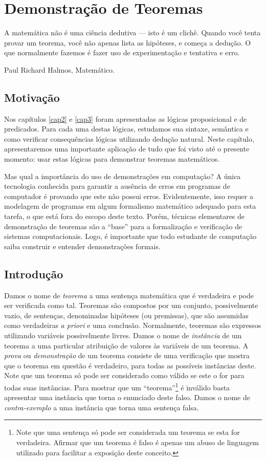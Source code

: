 \chapter{Demonstração de Teoremas}\label{cap4}

\epigraph{A matemática não é uma ciência dedutiva --- isto é um
  clichê. Quando você tenta provar um teorema, você não apenas lista
  as hipóteses, e começa a dedução. O que normalmente fazemos é fazer
  uso de experimentação e tentativa e erro.}{Paul Richard Halmos,
  Matemático.}

\section{Motivação}

Nos capítulos \ref{cap2} e \ref{cap3} foram apresentadas as lógicas
proposicional e de predicados. Para cada uma destas lógicas, estudamos
sua sintaxe, semântica e como verificar consequências lógicas
utilizando dedução natural. Neste capítulo, apresentaremos uma
importante aplicação de tudo que foi visto até o presente momento:
usar estas lógicas para demonstrar teoremas matemáticos.

Mas qual a importância do uso de demonstrações em computação? A única
tecnologia conhecida para garantir a ausência de erros em programas de
computador é provando que este não possui
erros. Evidentemente, isso requer a modelagem de programas em algum
formalismo matemático adequado para esta tarefa, o que está fora do
escopo deste texto. Porém, técnicas elementares de demonstração de
teoremas são a ``base'' para a formalização e verificação de sistemas
computacionais. Logo, é importante que todo estudante de computação
saiba construir e entender demonstrações formais.

\section{Introdução}

Damos o nome de \emph{teorema} a uma sentença matemática que é
verdadeira e pode ser verificada como tal. Teoremas são compostos por
um conjunto, possivelmente vazio, de sentenças, denominadas hipóteses
(ou premissas), que são assumidas como verdadeiras \emph{a priori} e
uma conclusão.
 Normalmente, teoremas
são expressos utilizando variáveis possivelmente livres. Damos o nome
de \emph{instância} de um teorema a uma particular atribuição de
valores às variáveis de um teorema.  A \emph{prova} ou
\emph{demonstração} de um teorema consiste de uma verificação que
mostra que o teorema em questão é verdadeiro, para todas as possíveis
instâncias deste. Note que um teorema só pode ser considerado como
válido se este o for para todas suas instâncias. Para mostrar que um
``teorema''\footnote{Note que uma sentença só pode ser
  considerada um teorema se esta for verdadeira. Afirmar que um
  teorema é falso é apenas um abuso de linguagem utilizado para
  facilitar a exposição deste conceito.} é inválido basta apresentar
uma instância que torna o enunciado deste falso. Damos o nome de
\emph{contra-exemplo} a uma instância que torna uma sentença falsa.

